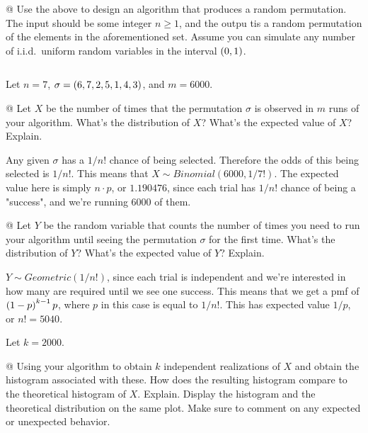 \documentclass[11pt]{article}
\begin{document}
    \begin{easylist}[enumerate]
        @ Use the above to design an algorithm that produces a random
        permutation. The input should be some integer $n \ge 1$, and the outpu
        tis a random permutation of the elements in the aforementioned set.
        Assume you can simulate any number of i.i.d.\ uniform random variables
        in the interval $\left( 0, 1 \right)$.

        \weave
        \inputminted[firstline=11,lastline=22]{python}{lab1_part1.py}
        \noweave

        Let $n=7$, $\sigma = \left( 6, 7, 2, 5, 1, 4, 3 \right)$, and $m = 6000$.

        @ Let $X$ be the number of times that the permutation $\sigma$ is
        observed in $m$ runs of your algorithm. What's the distribution of $X$?
        What's the expected value of $X$? Explain.

        \vspace{0.25cm}
        Any given $\sigma$ has a $1 / n!$ chance of being selected. Therefore
        the odds of this being selected is $1 / n!$. This means that $X\sim
        Binomial(6000, 1 / 7!)$. The expected value here is simply $n \cdot p$,
        or $1.190476$, since each trial has $1 / n!$ chance of being a
        "success", and we're running $6000$ of them.

        @ Let $Y$ be the random variable that counts the number of times you
        need to run your algorithm until seeing the permutation $\sigma$ for the
        first time. What's the distribution of $Y$? What's the expected value of
        $Y$? Explain.

        \vspace{0.25cm}
        $Y \sim Geometric(1 / n!)$, since each trial is independent and we're
        interested in how many are required until we see one success. This means
        that we get a pmf of $\left( 1 - p \right)^{k-1} p$, where $p$ in this case is
        equal to $1 / n!$. This has expected value $1 / p$, or $n! = 5040$.

        \vspace{0.25cm}
        Let $k = 2000$.

        @ Using your algorithm to obtain $k$ independent realizations of $X$ and
        obtain the histogram associated with these. How does the resulting
        histogram compare to the theoretical histogram of $X$. Explain. Display
        the histogram and the theoretical distribution on the same plot. Make
        sure to comment on any expected or unexpected behavior.


\end{easylist}
\end{document}

